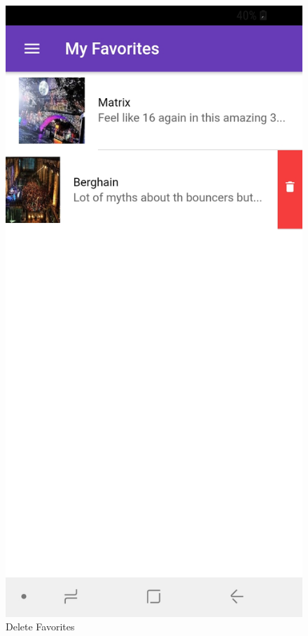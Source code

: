 \documentclass[12pt]{article}
\begin{document}
\begin{figure}[H]
  \includegraphics[width=\linewidth]{figures/Favorites_delete.jpg}
  \caption{Delete Favorites}\label{fig:awesome_image3}
\endminipage
\end{figure}
\end{document}

